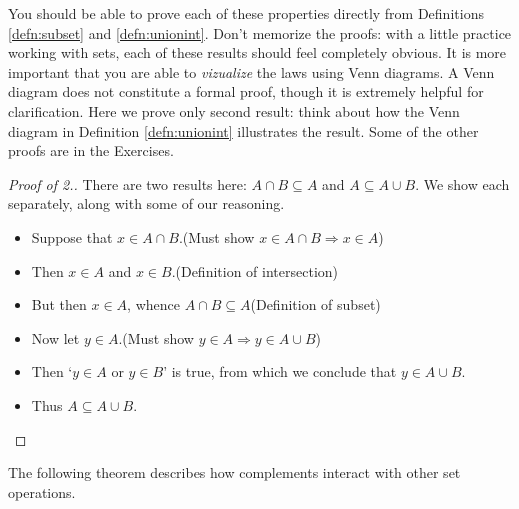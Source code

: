  You should be able to prove each of these properties directly from Definitions \ref{defn:subset} and \ref{defn:unionint}. Don't memorize the proofs: with a little practice working with sets, each of these results should feel completely obvious. It is more important that you are able to \emph{vizualize} the laws using Venn diagrams. A Venn diagram does not constitute a formal proof, though it is extremely helpful for clarification. Here we prove only second result: think about how the Venn diagram in Definition \ref{defn:unionint} illustrates the result. Some of the other proofs are in the Exercises.

\begin{proof}[Proof of 2.]
There are two results here: $A\cap B\subseteq A$ and $A\subseteq A\cup B$. We show each separately, along with some of our reasoning.
\begin{itemize}\setlength{\itemsep}{-2pt}
  \item[]Suppose that $x\in A\cap B$.\hfill(Must show $x\in A\cap B\Rightarrow x\in A$)
  \item[]Then $x\in A$ and $x\in B$.\hfill(Definition of intersection)
  \item[]But then $x\in A$, whence $A\cap B\subseteq A$\hfill(Definition of subset)
  \item[]Now let $y\in A$.\hfill(Must show $y\in A\Rightarrow y\in A\cup B$)
  \item[]Then `$y\in A$ or $y\in B$' is true, from which we conclude that $y\in A\cup B$.
  \item[]Thus $A\subseteq A\cup B$.\qedhere
\end{itemize}
\end{proof}

The following theorem describes how complements interact with other set operations.\par


